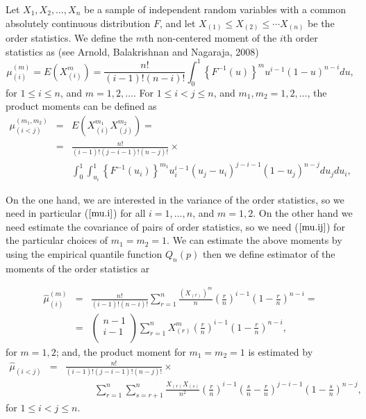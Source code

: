 \documentclass[preprint,12pt]{elsarticle}
\begin{document}
\noindent Let $X_1,X_2,\ldots, X_n$ be a sample of independent random variables with a common absolutely continuous distribution $F$, and let  $X_{(1)} \leq X_{(2)}\leq \cdots X_{(n)}$ be the order statistics. 
We define the $m$th non-centered moment of the $i$th order statistics as (see Arnold, Balakrishnan and Nagaraja, 2008)
\begin{equation}\label{mu.i}
\mu_{(i)}^{(m)}=E\left(X_{(i)}^m\right)=\frac{n!}{(i-1)!(n-i)!}\int_0^1\left\{F^{-1}(u)\right\}^m u^{i-1}(1-u)^{n-i}du,
\end{equation}
for $1\leq i \leq n$, and $m=1,2, \ldots$. For $1 \leq i < j \leq n$, and $m_1, m_2=1,2,\ldots$, the product moments can be defined as
\begin{eqnarray}\label{mu.ij}
\mu_{(i<j)}^{(m_1,m_2)}&=&E\left(X_{(i)}^{m_1}X_{(j)}^{m_2}\right)= \\
\nonumber &=&\frac{n!}{(i-1)!(j-i-1)!(n-j)!} \times \\
\nonumber \quad \quad \quad &&\int_0^1\int_{u_i}^1\left\{F^{-1}(u_i)\right\}^{m_1} u_i^{i-1}(u_j-u_i)^{j-i-1}(1-u_j)^{n-j}du_jdu_i,
\end{eqnarray}

On the one hand, we are interested in the variance of the order statistics, so we need in particular ($\ref{mu.i}$) for all $i=1,\ldots,n$, and $m=1,2$. On the other hand we need estimate the covariance of pairs of order statistics, so we need ($\ref{mu.ij}$) for the particular choices of $m_1=m_2=1$. We can estimate the above moments by using the empirical quantile function $Q_n(p)$ then we define estimator of the moments of the order statistics ar

\begin{eqnarray}\label{hat.mu.i}
\widehat{\mu}_{(i)}^{(m)}&=&\frac{n!}{(i-1)!(n-i)!}\sum_{r=1}^n \frac{\left(X_{(r)}\right)^m}{n} \left(\frac{r}{n}\right)^{i-1}\left(1-\frac{r}{n}\right)^{n-i}= \\
\nonumber &=&\left(\begin{array}{c} n-1 \\ i-1 \\ \end{array}\right)\sum_{r=1}^n X_{(r)}^m \left(\frac{r}{n}\right)^{i-1}\left(1-\frac{r}{n}\right)^{n-i},
\end{eqnarray}
for $m=1,2$; and, the product moment for $m_1=m_2=1$ is estimated by
\begin{eqnarray}\label{hat.mu.ij} 
\widehat{\mu}_{(i<j)}&=&\frac{n!}{(i-1)!(j-i-1)!(n-j)!} \times \\ 
\nonumber && \quad \quad \quad \sum_{r=1}^n\sum_{s=r+1}^n\frac{X_{(r)}X_{(s)}}{n^2}\left(\frac{r}{n}\right)^{i-1}
                                       \left(\frac{s}{n}-\frac{r}{n}\right)^{j-i-1}\left(1-\frac{s}{n}\right)^{n-j},
\end{eqnarray}
for $1 \leq i<j \leq n$.
\newpage
\end{document}
